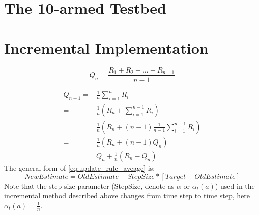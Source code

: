 \section{The 10-armed Testbed}

\section{Incremental Implementation}
\begin{equation}
    Q_n \dot{=} \frac{R_1+R_2+\dots+R_{n-1}}{n-1}
\end{equation}

\begin{equation}
\label{eq:update_rule_aveage}
\begin{split}
    Q_{n+1} = & \frac{1}{n}\sum_{i=1}^{n}R_i \\
    =&\frac{1}{n}(R_n+\sum_{i=1}^{n-1}R_i)\\
    =&\frac{1}{n}(R_n+(n-1)\frac{1}{n-1}\sum_{i=1}^{n-1}R_i)\\
    =&\frac{1}{n}(R_n+(n-1)Q_n)\\
    =&Q_n + \frac{1}{n}(R_n-Q_n)
\end{split}
\end{equation}
The general form of \ref{eq:update_rule_aveage} is:
\begin{equation}
    NewEstimate = OldEstimate + StepSize * [Target - OldEstimate]
\end{equation}
Note that the step-size parameter (StepSize, denote as $\alpha$ or $\alpha_t(a)$) used in the incremental method described above changes from time step to time step, here $\alpha_t(a)=\frac{1}{n}$.


